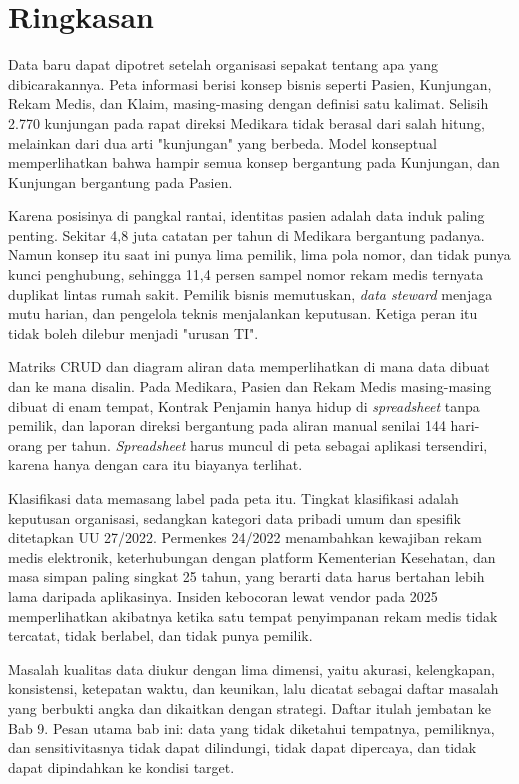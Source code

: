 \section{Ringkasan}

Data baru dapat dipotret setelah organisasi sepakat tentang apa yang
dibicarakannya. Peta informasi berisi konsep bisnis seperti Pasien, Kunjungan,
Rekam Medis, dan Klaim, masing-masing dengan definisi satu kalimat. Selisih
2.770 kunjungan pada rapat direksi Medikara tidak berasal dari salah hitung,
melainkan dari dua arti "kunjungan" yang berbeda. Model konseptual
memperlihatkan bahwa hampir semua konsep bergantung pada Kunjungan, dan
Kunjungan bergantung pada Pasien.

Karena posisinya di pangkal rantai, identitas pasien adalah data induk paling
penting. Sekitar 4,8 juta catatan per tahun di Medikara bergantung padanya.
Namun konsep itu saat ini punya lima pemilik, lima pola nomor, dan tidak punya
kunci penghubung, sehingga 11,4 persen sampel nomor rekam medis ternyata
duplikat lintas rumah sakit. Pemilik bisnis memutuskan, \textit{data steward}
menjaga mutu harian, dan pengelola teknis menjalankan keputusan. Ketiga peran
itu tidak boleh dilebur menjadi "urusan TI".

Matriks CRUD dan diagram aliran data memperlihatkan di mana data dibuat dan ke
mana disalin. Pada Medikara, Pasien dan Rekam Medis masing-masing dibuat di
enam tempat, Kontrak Penjamin hanya hidup di \textit{spreadsheet} tanpa
pemilik, dan laporan direksi bergantung pada aliran manual senilai 144
hari-orang per tahun. \textit{Spreadsheet} harus muncul di peta sebagai aplikasi
tersendiri, karena hanya dengan cara itu biayanya terlihat.

Klasifikasi data memasang label pada peta itu. Tingkat klasifikasi adalah
keputusan organisasi, sedangkan kategori data pribadi umum dan spesifik
ditetapkan UU 27/2022. Permenkes 24/2022 menambahkan kewajiban rekam medis
elektronik, keterhubungan dengan platform Kementerian Kesehatan, dan masa
simpan paling singkat 25 tahun, yang berarti data harus bertahan lebih lama
daripada aplikasinya. Insiden kebocoran lewat vendor pada 2025 memperlihatkan
akibatnya ketika satu tempat penyimpanan rekam medis tidak tercatat, tidak
berlabel, dan tidak punya pemilik.

Masalah kualitas data diukur dengan lima dimensi, yaitu akurasi, kelengkapan,
konsistensi, ketepatan waktu, dan keunikan, lalu dicatat sebagai daftar masalah
yang berbukti angka dan dikaitkan dengan strategi. Daftar itulah jembatan ke
Bab 9. Pesan utama bab ini: data yang tidak diketahui tempatnya, pemiliknya,
dan sensitivitasnya tidak dapat dilindungi, tidak dapat dipercaya, dan tidak
dapat dipindahkan ke kondisi target.

